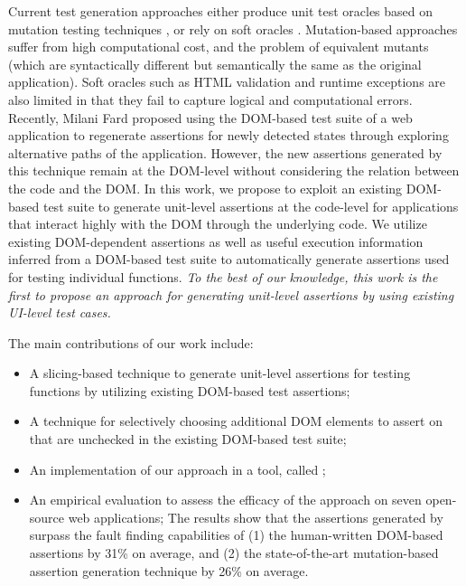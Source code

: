 Current test generation approaches either produce unit test oracles based on mutation testing techniques \cite{mirshokraie:icst15, fraser:tse12}, or rely on soft oracles \cite{artzi:icse11}. Mutation-based approaches suffer from high computational cost, and the problem of equivalent mutants (which are syntactically different but semantically the same as the original application).
Soft oracles such as HTML validation and runtime exceptions are also limited in that they fail to capture logical and computational errors. 
Recently, Milani Fard \etal \cite{milanifard:ase14} proposed using the DOM-based test suite of a web application to regenerate assertions for newly detected states through exploring alternative paths of the application. However, the new assertions generated by this technique remain at the DOM-level without considering the relation between the \javascript code and the DOM.
In this work, we propose to exploit an existing DOM-based test suite to generate unit-level assertions at the code-level for applications that interact highly with the DOM through the underlying \javascript code. We utilize
existing DOM-dependent assertions as well as useful execution information inferred from a DOM-based test suite to automatically generate assertions used for testing individual \javascript functions. 
{\em To the best of our knowledge, this work is the first to propose an approach for generating unit-level assertions by using existing UI-level test cases.} 

The main contributions of our work include:
\begin{itemize}[noitemsep]
\item A slicing-based technique to generate unit-level assertions for testing \javascript functions by utilizing existing DOM-based test assertions;
\item A technique for selectively choosing additional DOM elements to assert on that are unchecked in the existing DOM-based test suite;
\item An implementation of our approach in a tool, called \tool; 
\item An empirical evaluation to assess the efficacy of the approach on seven open-source web applications;
The results show that the assertions generated by \tool surpass the fault finding capabilities of (1) the human-written DOM-based assertions by 31\% on average, and (2) the state-of-the-art mutation-based assertion generation technique by 26\% on average.
\end{itemize} 